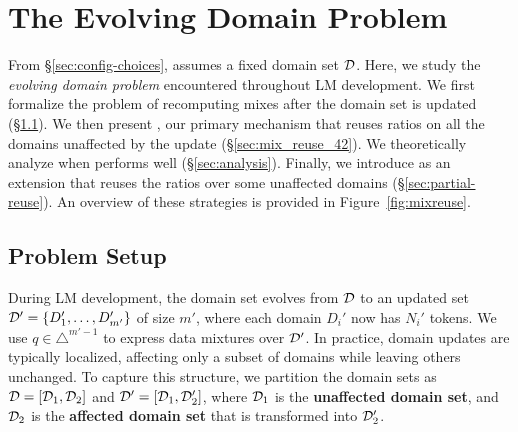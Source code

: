 \section{The Evolving Domain Problem}\label{sec:conditional_mixing}

From \S\ref{sec:config-choices}, \base assumes a fixed domain set $\mathcal{D}$. Here, we study the \emph{evolving domain problem} encountered throughout LM development.
We first formalize the problem of recomputing mixes after the domain set is updated (\S\ref{sec:problem-setup-evolving-domain}). We then present \fullmixreuse, our primary mechanism that reuses ratios on all the domains unaffected by the update (\S\ref{sec:mix_reuse_42}). We theoretically analyze when \fullmixreuse performs well (\S\ref{sec:analysis}). Finally, we introduce \partialmixreuse as an extension that reuses the ratios over some unaffected domains (\S\ref{sec:partial-reuse}). An overview of these strategies is provided in Figure~\ref{fig:mixreuse}.

\subsection{Problem Setup}
\label{sec:problem-setup-evolving-domain}

During LM development, the domain set evolves from $\mathcal{D}$ to an updated set $\mathcal{D}' = \{D_1', \dots, D_{m'}'\}$ of size $m'$, where each domain $D_i'$ now has $N_i'$ tokens. We use $q \in \triangle^{m'-1}$ to express data mixtures over $\mathcal{D}'$.
In practice, domain updates are typically localized, affecting only a subset of domains while leaving others unchanged.
To capture this structure, we partition the domain sets as $\mathcal{D} = [\mathcal{D}_1, \mathcal{D}_2]$ and $\mathcal{D}' = [\mathcal{D}_1, \mathcal{D}_2']$, where $\mathcal{D}_1$ is the \textbf{unaffected domain set}, and $\mathcal{D}_2$ is the \textbf{affected domain set} that is transformed into $\mathcal{D}_2'$.

